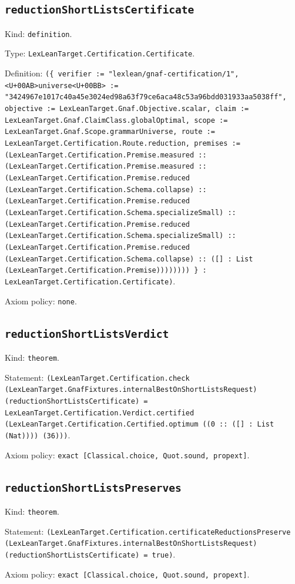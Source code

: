 \documentclass[11pt]{article}
\begin{document}
\subsection*{\texttt{reductionShortListsCertificate}}
\noindent Kind: \texttt{definition}.\par
\noindent Type: \texttt{LexLeanTarget.Certification.Certificate}.\par
\noindent Definition: \texttt{(\{ verifier := "lexlean/gnaf-certification/1", <U+00AB>universe<U+00BB> := "3424967e1017c40a45e3024ed98a63f79ce6aca48c53a96bdd031933aa5038ff", objective := LexLeanTarget.Gnaf.Objective.scalar, claim := LexLeanTarget.Gnaf.ClaimClass.globalOptimal, scope := LexLeanTarget.Gnaf.Scope.grammarUniverse, route := LexLeanTarget.Certification.Route.reduction, premises := (LexLeanTarget.Certification.Premise.measured :: (LexLeanTarget.Certification.Premise.measured :: (LexLeanTarget.Certification.Premise.reduced (LexLeanTarget.Certification.Schema.collapse) :: (LexLeanTarget.Certification.Premise.reduced (LexLeanTarget.Certification.Schema.specializeSmall) :: (LexLeanTarget.Certification.Premise.reduced (LexLeanTarget.Certification.Schema.specializeSmall) :: (LexLeanTarget.Certification.Premise.reduced (LexLeanTarget.Certification.Schema.collapse) :: ([] : List (LexLeanTarget.Certification.Premise)))))))) \} : LexLeanTarget.Certification.Certificate)}.\par
\noindent Axiom policy: \texttt{none}.\par
\subsection*{\texttt{reductionShortListsVerdict}}
\noindent Kind: \texttt{theorem}.\par
\noindent Statement: \texttt{(LexLeanTarget.Certification.check (LexLeanTarget.GnafFixtures.internalBestOnShortListsRequest) (reductionShortListsCertificate) = LexLeanTarget.Certification.Verdict.certified (LexLeanTarget.Certification.Certified.optimum ((0 :: ([] : List (Nat)))) (36)))}.\par
\noindent Axiom policy: \texttt{exact [Classical.choice, Quot.sound, propext]}.\par
\subsection*{\texttt{reductionShortListsPreserves}}
\noindent Kind: \texttt{theorem}.\par
\noindent Statement: \texttt{(LexLeanTarget.Certification.certificateReductionsPreserve (LexLeanTarget.GnafFixtures.internalBestOnShortListsRequest) (reductionShortListsCertificate) = true)}.\par
\noindent Axiom policy: \texttt{exact [Classical.choice, Quot.sound, propext]}.\par
\end{document}
